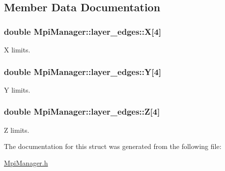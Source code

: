 \subsection{Member Data Documentation}
\subsubsection[{\texorpdfstring{X}{X}}]{\setlength{\rightskip}{0pt plus 5cm}double Mpi\+Manager\+::layer\+\_\+edges\+::X\mbox{[}4\mbox{]}}\hypertarget{struct_mpi_manager_1_1layer__edges_a9f79fa4b504f2d4418f2bc4747cc908c}{}\label{struct_mpi_manager_1_1layer__edges_a9f79fa4b504f2d4418f2bc4747cc908c}


X limits. 

\subsubsection[{\texorpdfstring{Y}{Y}}]{\setlength{\rightskip}{0pt plus 5cm}double Mpi\+Manager\+::layer\+\_\+edges\+::Y\mbox{[}4\mbox{]}}\hypertarget{struct_mpi_manager_1_1layer__edges_aa4d880e027a6410ff4b34e28dcd1f9d4}{}\label{struct_mpi_manager_1_1layer__edges_aa4d880e027a6410ff4b34e28dcd1f9d4}


Y limits. 

\subsubsection[{\texorpdfstring{Z}{Z}}]{\setlength{\rightskip}{0pt plus 5cm}double Mpi\+Manager\+::layer\+\_\+edges\+::Z\mbox{[}4\mbox{]}}\hypertarget{struct_mpi_manager_1_1layer__edges_a25eea1176a0c06c1e25a7a08b8840283}{}\label{struct_mpi_manager_1_1layer__edges_a25eea1176a0c06c1e25a7a08b8840283}


Z limits. 



The documentation for this struct was generated from the following file\+:\begin{DoxyCompactItemize}
\item 
\hyperlink{_mpi_manager_8h}{Mpi\+Manager.\+h}\end{DoxyCompactItemize}
